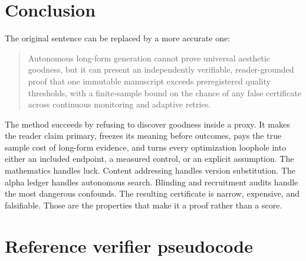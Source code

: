 \documentclass[11pt]{article}
\theoremstyle{remark}
\begin{document}
\section{Conclusion}

The original sentence can be replaced by a more accurate one:

\begin{quote}
Autonomous long-form generation cannot prove universal aesthetic goodness, but it can
present an independently verifiable, reader-grounded proof that one immutable manuscript
exceeds preregistered quality thresholds, with a finite-sample bound on the chance of any
false certificate across continuous monitoring and adaptive retries.
\end{quote}

The method succeeds by refusing to discover goodness inside a proxy. It makes the reader
claim primary, freezes its meaning before outcomes, pays the true sample cost of long-form
evidence, and turns every optimization loophole into either an included endpoint, a measured
control, or an explicit assumption. The mathematics handles luck. Content addressing handles
version substitution. The alpha ledger handles autonomous search. Blinding and recruitment
audits handle the most dangerous confounds. The resulting certificate is narrow, expensive,
and falsifiable. Those are the properties that make it a proof rather than a score.

\appendix

\section{Reference verifier pseudocode}
\end{document}
